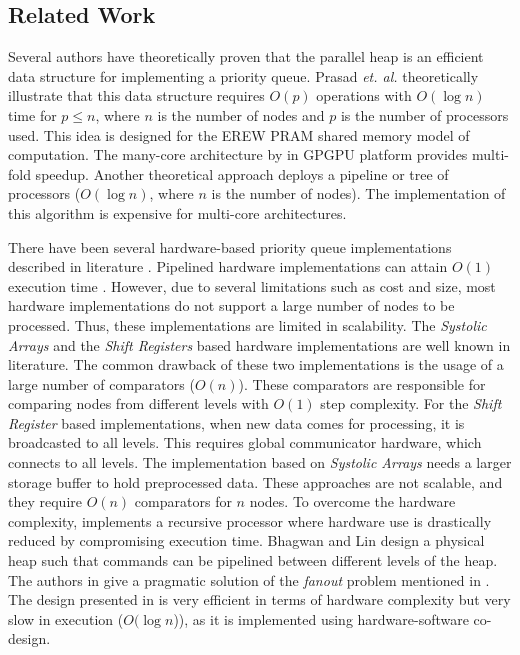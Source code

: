 \documentclass[10pt, conference, compsocconf]{IEEEtran}
\begin{document}
\subsection{Related Work}
Several authors have theoretically proven that the parallel heap is an efficient data structure for implementing a priority queue.
Prasad {\it et. al.} \cite{pq0,pq3} theoretically illustrate that this data structure requires $O(p)$ operations with $O(\log n)$ time for $p \leq n$, where $n$ is the number of nodes and $p$ is the number of processors used.
This idea is designed for the EREW PRAM shared memory model of computation.
The many-core architecture by \cite{pq2} in GPGPU platform provides multi-fold speedup.
Another theoretical approach \cite{pq4} deploys a pipeline or tree of processors ($O(\log n)$, where $n$ is the number of nodes).
The implementation of this algorithm \cite{pq5} is expensive for multi-core architectures.

There have been several hardware-based priority queue implementations described in literature \cite{hw1,hw2,hw3,hw5,hw6,hw7,hw8,hw9}.
Pipelined hardware implementations can attain $O(1)$ execution time \cite{hw5,hw6}.
However, due to several limitations such as cost and size, most hardware implementations do not support a large number of nodes to be processed.
Thus, these implementations are limited in scalability.
The {\it Systolic Arrays} and the {\it Shift Registers} \cite{hw8,hw9} based hardware implementations are well known in literature.
The common drawback of these two implementations is the usage of a large number of comparators ($O(n)$).
These comparators are responsible for comparing nodes from different levels with $O(1)$ step complexity.
For the {\it Shift Register} \cite{hw9} based implementations, when new data comes for processing, it is broadcasted to all levels.
This requires global communicator hardware, which connects to all levels.
The implementation based on {\it Systolic Arrays} \cite{hw8} needs a larger storage buffer to hold preprocessed data.
These approaches are not scalable, and they require $O(n)$ comparators for $n$ nodes.
To overcome the hardware complexity, \cite{hw10} implements a recursive processor where hardware use is drastically reduced by compromising execution time.
Bhagwan and Lin \cite{hw2} design a physical heap such that commands can be pipelined between different levels of the heap.
The authors in \cite{hw1} give a pragmatic solution of the {\it fanout} problem mentioned in \cite{hw3}.
The design presented in \cite{hw11} is very efficient in terms of hardware complexity but very slow in execution ($O(\log n$)), as it is implemented using hardware-software co-design.
\end{document}
